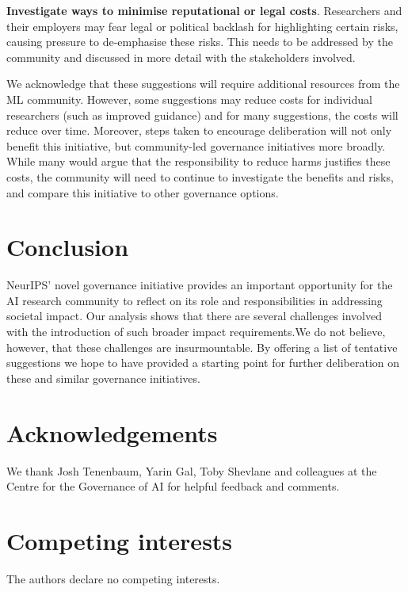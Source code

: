 \documentclass[11pt,english]{article}
\begin{document}
\textbf{Investigate ways to minimise reputational or legal costs}. Researchers and their employers may fear legal or political backlash for highlighting certain risks, causing pressure to de-emphasise these risks. This needs to be addressed by the community and discussed in more detail with the stakeholders involved.



We acknowledge that these suggestions will require additional resources from the ML community. However, some suggestions may reduce costs for individual researchers (such as improved guidance) and for many suggestions, the costs will reduce over time. Moreover, steps taken to encourage deliberation will not only benefit this initiative, but community-led governance initiatives more broadly. While many would argue that the responsibility to reduce harms justifies these costs, the community will need to continue to investigate the benefits and risks, and compare this initiative to other governance options.

\section{Conclusion}
NeurIPS' novel governance initiative provides an important opportunity for the AI research community to reflect on its role and responsibilities in addressing societal impact. Our analysis shows that there are several challenges involved with the introduction of such broader impact requirements.We do not believe, however, that these challenges are insurmountable. By offering a list of tentative suggestions we hope to have provided a starting point for further deliberation on these and similar governance initiatives. 


\section{Acknowledgements}
We thank Josh Tenenbaum, Yarin Gal, Toby Shevlane and colleagues at the Centre for the Governance of AI for helpful feedback and comments. 

\section{Competing interests}
The authors declare no competing interests. 
\end{document}
